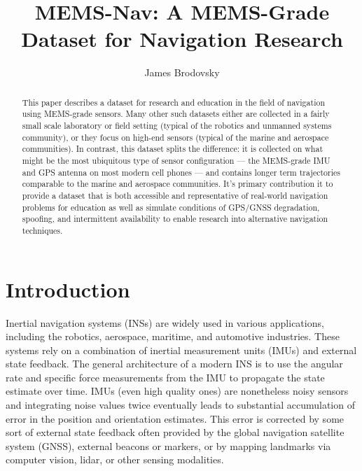\documentclass[sageh,times]{sagej}
\begin{document}

\title{MEMS-Nav: A MEMS-Grade Dataset for Navigation Research}
\author{James Brodovsky}

\begin{abstract}
This paper describes a dataset for research and education in the field of navigation using MEMS-grade sensors. Many other such datasets either are collected in a fairly small scale laboratory or field setting (typical of the robotics and unmanned systems community), or they focus on high-end sensors (typical of the marine and aerospace communities). In contrast, this dataset splits the difference: it is collected on what might be the most ubiquitous type of sensor configuration --- the MEMS-grade IMU and GPS antenna on most modern cell phones --- and contains longer term trajectories comparable to the marine and aerospace communities. It's primary contribution it to provide a dataset that is both accessible and representative of real-world navigation problems for education as well as simulate conditions of GPS/GNSS degradation, spoofing, and intermittent availability to enable research into alternative navigation techniques.
\end{abstract}

\maketitle
\section{Introduction}
Inertial navigation systems (INSs) are widely used in various applications, including the robotics, aerospace, maritime, and automotive industries. These systems rely on a combination of inertial measurement units (IMUs) and external state feedback. The general architecture of a modern INS is to use the angular rate and specific force measurements from the IMU to propagate the state estimate over time. IMUs (even high quality ones) are nonetheless noisy sensors and integrating noise values twice eventually leads to substantial accumulation of error in the position and orientation estimates. This error is corrected by some sort of external state feedback often provided by the global navigation satellite system (GNSS), external beacons or markers, or by mapping landmarks via computer vision, lidar, or other sensing modalities. 
\end{document}

